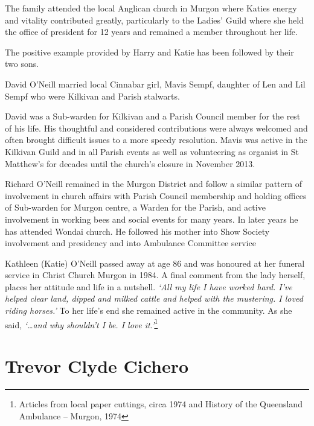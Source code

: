 The family attended the local Anglican church in Murgon where Katies energy and vitality contributed greatly, particularly to the Ladies' Guild where she held the office of president for 12 years and remained a member throughout her life.



The positive example provided by Harry and Katie has been followed by their two sons.



David O'Neill married local Cinnabar girl, Mavis Sempf, daughter of Len and Lil Sempf who were Kilkivan and Parish stalwarts.



David was a Sub-warden for Kilkivan and a Parish Council member for the rest of his life. His thoughtful and considered contributions were always welcomed and often brought difficult issues to a more speedy resolution. Mavis was active in the Kilkivan Guild and in all Parish events as well as volunteering as organist in St Matthew's for decades until the church's closure in November 2013.



Richard O'Neill remained in the Murgon District and follow a similar pattern of involvement in church affairs with Parish Council membership and holding offices of Sub-warden for Murgon centre, a Warden for the Parish, and active involvement in working bees and social events for many years. In later years he has attended Wondai church. He followed his mother into Show Society involvement and presidency and into Ambulance Committee service



Kathleen (Katie) O'Neill passed away at age 86 and was honoured at her funeral service in Christ Church Murgon in 1984. A final comment from the lady herself, places her attitude and life in a nutshell. \emph{`All my life I have worked hard. I've helped clear land, dipped and milked cattle and helped with the mustering. I loved riding horses.'} To her life's end she remained active in the community. As she said, \emph{`\ldots and why shouldn't I be. I love it.'}\footnote{Articles from local paper cuttings, circa 1974 and History of the Queensland Ambulance -- Murgon, 1974}


\section{Trevor Clyde Cichero}



